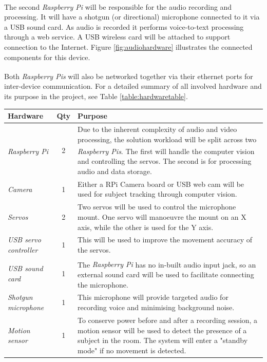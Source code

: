 \documentclass[11pt,a4paper,titlepage]{report}
\newcommand{\rpi}{\textit{Raspberry Pi\textsuperscript{\textregistered}}}
\newcommand{\rpis}{\textit{Raspberry Pi\textsuperscript{\textregistered}s}}
\begin{document}
The second \rpi\xspace will be responsible for the audio recording and processing. It will have a shotgun (or directional) microphone connected to it via a USB sound card.  As audio is recorded it performs voice-to-text processing through a web service. A USB wireless card will be attached to support connection to the Internet. Figure \ref{fig:audiohardware} illustrates the connected components for this device.

Both \rpis\xspace will also be networked together via their ethernet ports for inter-device communication. For a detailed summary of all involved hardware and its purpose in the project, see Table \ref{table:hardwaretable}. 


\begin{center}
\begin{table}
{\tabulinesep=1.8mm
\begin{tabu}{ lcp{7cm} }

    \textbf{Hardware} & \textbf{Qty} & \textbf{Purpose} \\ \hline
    
    \rpi & 2 & Due to the inherent complexity of audio and video processing, the solution workload will be split across two \rpis. The first will handle the computer vision and controlling the servos. The second is for processing audio and data storage.\\ 

    \textit{Camera} & 1 & Either a RPi Camera board or USB web cam will be used for subject tracking through computer vision. \\ 
    
   \textit{Servos} & 2 & Two servos will be used to control the microphone mount. One servo will manoeuvre the mount on an X axis, while the other is used for the Y axis. \\ 
        
    \textit{USB servo controller} & 1 & This will be used to improve the movement accuracy of the servos. \\ 
    
    \textit{USB sound card} & 1 & The \rpi\xspace has no in-built audio input jack, so an external sound card will be used to facilitate connecting the microphone. \\ 
    
    \textit{Shotgun microphone} & 1 & This microphone will provide targeted audio for recording voice and minimising background noise. \\ 
    
    \textit{Motion sensor} & 1 & To conserve power before and after a recording session, a motion sensor will be used to detect the presence of a subject in the room. The system will enter a "standby mode" if no movement is detected.\\ 


\end{tabu}}
\end{table}
\end{center}
\end{document}
